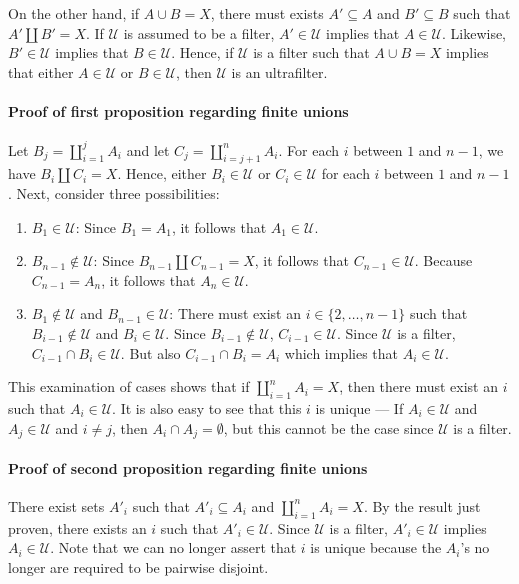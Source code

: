 \documentclass[12pt]{article}
\begin{document}
On the other hand, if $A \cup B = X$, there must exists $A' \subseteq A$ and $B' \subseteq B$ such that $A' \coprod B' = X$.  If $\mathcal{U}$ is assumed to be a filter, $A' \in \mathcal{U}$ implies that $A \in \mathcal{U}$.  Likewise, $B' \in \mathcal{U}$ implies that $B \in \mathcal{U}$.  Hence, if $\mathcal{U}$ is a filter such that $A \cup B = X$ implies that either $A \in \mathcal{U}$ or $B \in \mathcal{U}$, then $\mathcal{U}$ is an ultrafilter.

\paragraph {Proof of first proposition regarding finite unions}
Let $B_j = \coprod_{i=1}^j A_i$ and let $C_j = \coprod_{i=j+1}^n A_i$.  For each $i$ between $1$ and $n-1$, we have $B_i \coprod C_i = X$.  Hence, either $B_i \in \mathcal{U}$ or $C_i \in \mathcal{U}$ for each $i$ between $1$ and $n-1$. Next, consider three possibilities:
\begin{enumerate}
\item  $B_1 \in \mathcal{U}$:  Since $B_1 = A_1$, it follows that $A_1 \in \mathcal{U}$.
\item  $B_{n-1} \notin \mathcal{U}$:  Since $B_{n-1} \coprod C_{n-1} = X$, it follows that $C_{n-1} \in \mathcal{U}$.  Because $C_{n-1} = A_n$, it follows that $A_n \in \mathcal{U}$.
\item  $B_1 \notin \mathcal{U}$ and $B_{n-1} \in \mathcal{U}$:  There must exist an $i \in \{2, \ldots, n-1\}$ such that $B_{i-1} \notin \mathcal{U}$ and $B_i \in \mathcal{U}$.  Since $B_{i-1} \notin \mathcal{U}$, $C_{i-1} \in \mathcal{U}$.  
Since $\mathcal{U}$ is a filter, $C_{i-1} \cap B_i \in \mathcal{U}$. But also $C_{i-1} \cap B_i = A_i$  which implies that $A_i \in \mathcal{U}$.
\end{enumerate}
This examination of cases shows that if $\coprod_{i=1}^n A_i = X$, then there must exist an $i$ such that $A_i \in \mathcal{U}$.  It is also easy to see that this $i$ is unique --- If $A_i \in \mathcal{U}$ and $A_j \in \mathcal{U}$ and $i \ne j$, then $A_i \cap A_j = \emptyset$, but this cannot be the case since $\mathcal{U}$ is a filter.

\paragraph {Proof of second proposition regarding finite unions}
There exist sets $A'_i$ such that $A'_i \subseteq A_i$ and $\coprod_{i=1}^n A_i = X$.  By the result just proven, there exists an $i$ such that $A'_i \in \mathcal{U}$.  Since $\mathcal{U}$ is a filter, $A'_i \in \mathcal{U}$ implies $A_i \in \mathcal{U}$.  Note that we can no longer assert that $i$ is unique because the $A_i$'s no longer are required to be pairwise disjoint.
\end{document}
